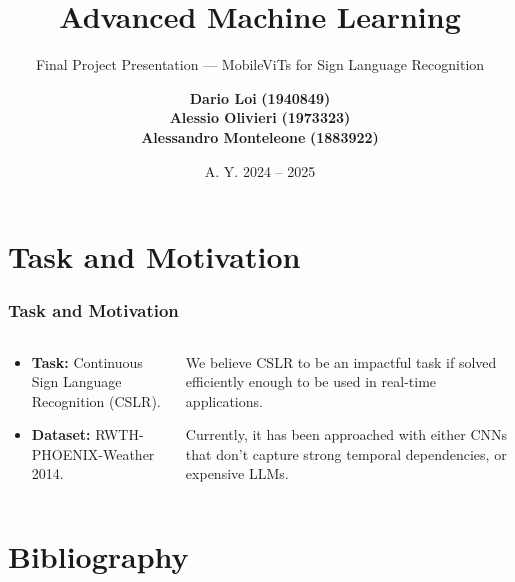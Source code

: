 \documentclass[english, xcolor={table}]{beamer}
\author{\scriptsize \textbf{Dario Loi}  \textbf{(1940849)} \\ \textbf{Alessio Olivieri} \textbf{(1973323)} \\ \textbf{Alessandro Monteleone} \textbf{(1883922)}}
\title{Advanced Machine Learning}
\subtitle{Final Project Presentation --- MobileViTs for Sign Language Recognition}
\institute{M.Sc. in Computer Science, \\ Sapienza, University of Rome.}
\date{A. Y. 2024 -- 2025}
\begin{document}
\maketitle

\section{Task and Motivation}


\begin{frame}
  \frametitle{Task and Motivation}

  \begin{columns}
    \begin{column}{0.4\textwidth}
      \begin{itemize}
        \item \textbf{Task:} Continuous Sign Language Recognition (CSLR).
        \item \textbf{Dataset:} RWTH-PHOENIX-Weather 2014.
      \end{itemize}
    \end{column}
    \begin{column}{0.6\textwidth}
        We believe CSLR to be an impactful task if solved efficiently enough to be used in real-time applications.


        Currently, it has been approached with either CNNs\cite{hu_continuous_2023, ahn_slowfast_2023} that don't capture strong temporal dependencies,
        or expensive LLMs\cite{gong_llms_2024}. 
      \end{column}
  \end{columns}
\end{frame}

\section{Bibliography}



\end{document}
